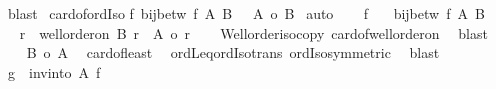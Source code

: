 \begin{isabellebody}
\ blast%
\endisatagproof
{\isafoldproof}%
%
\isadelimproof
\isanewline
%
\endisadelimproof
\isanewline
{}\isamarkupfalse%
\ card{\isacharunderscore}{\kern0pt}of{\isacharunderscore}{\kern0pt}ordIso{\isacharcolon}{\kern0pt}\isanewline
{\isachardoublequoteopen}{\isacharparenleft}{\kern0pt}{\isasymexists}f{\isachardot}{\kern0pt}\ bij{\isacharunderscore}{\kern0pt}betw\ f\ A\ B{\isacharparenright}{\kern0pt}\ {\isacharequal}{\kern0pt}\ {\isacharparenleft}{\kern0pt}\ {\isacharbar}{\kern0pt}A{\isacharbar}{\kern0pt}\ {\isacharequal}{\kern0pt}o\ {\isacharbar}{\kern0pt}B{\isacharbar}{\kern0pt}\ {\isacharparenright}{\kern0pt}{\isachardoublequoteclose}\isanewline
%
\isadelimproof
%
\endisadelimproof
%
\isatagproof
{}\isamarkupfalse%
{\isacharparenleft}{\kern0pt}auto{\isacharparenright}{\kern0pt}\isanewline
\ \ \isamarkupfalse%
\ f\ \isamarkupfalse%
\ {\isacharasterisk}{\kern0pt}{\isacharcolon}{\kern0pt}\ {\isachardoublequoteopen}bij{\isacharunderscore}{\kern0pt}betw\ f\ A\ B{\isachardoublequoteclose}\isanewline
\ \ \isamarkupfalse%
\ \isamarkupfalse%
\ r\ \ {\isachardoublequoteopen}well{\isacharunderscore}{\kern0pt}order{\isacharunderscore}{\kern0pt}on\ B\ r\ {\isasymand}\ {\isacharbar}{\kern0pt}A{\isacharbar}{\kern0pt}\ {\isacharequal}{\kern0pt}o\ r{\isachardoublequoteclose}\isanewline
\ \ \isamarkupfalse%
\ Well{\isacharunderscore}{\kern0pt}order{\isacharunderscore}{\kern0pt}iso{\isacharunderscore}{\kern0pt}copy\ card{\isacharunderscore}{\kern0pt}of{\isacharunderscore}{\kern0pt}well{\isacharunderscore}{\kern0pt}order{\isacharunderscore}{\kern0pt}on\ \isamarkupfalse%
\ blast\isanewline
\ \ \isamarkupfalse%
\ {\isachardoublequoteopen}{\isacharbar}{\kern0pt}B{\isacharbar}{\kern0pt}\ {\isasymle}o\ {\isacharbar}{\kern0pt}A{\isacharbar}{\kern0pt}{\isachardoublequoteclose}\ \isamarkupfalse%
\ card{\isacharunderscore}{\kern0pt}of{\isacharunderscore}{\kern0pt}least\isanewline
\ \ ordLeq{\isacharunderscore}{\kern0pt}ordIso{\isacharunderscore}{\kern0pt}trans\ ordIso{\isacharunderscore}{\kern0pt}symmetric\ \isamarkupfalse%
\ blast\isanewline
\ \ \isamarkupfalse%
\isanewline
\ \ \isacommand{{\isacharbraceleft}{\kern0pt}}\isamarkupfalse%
\isamarkupfalse%
\ {\isacharquery}{\kern0pt}g\ {\isacharequal}{\kern0pt}\ {\isachardoublequoteopen}inv{\isacharunderscore}{\kern0pt}into\ A\ f{\isachardoublequoteclose}\isanewline
\ \ \ \isamarkupfalse%

\end{isabellebody}
